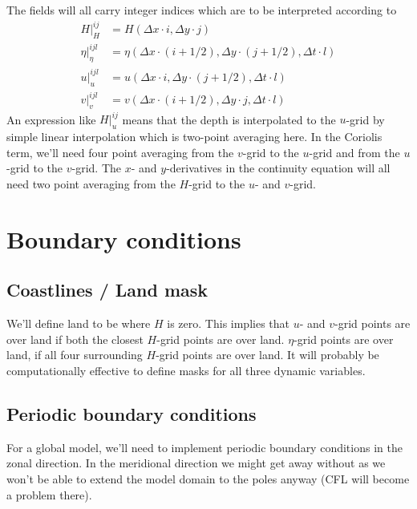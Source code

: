 \documentclass[a4paper]{article}
\begin{document}
The fields will all carry integer indices which are to be interpreted according to
\begin{align}
  H|_H^{ij} & = H(\Delta x \cdot i, \Delta y \cdot j) \\
  \eta|_\eta^{ijl} & = \eta(\Delta x \cdot (i+1/2), \Delta y \cdot (j+1/2), \Delta t \cdot l) \\
  u|_u^{ijl} & = u(\Delta x \cdot i, \Delta y \cdot (j+1/2), \Delta t \cdot l) \\
  v|_v^{ijl} & = v(\Delta x \cdot (i+1/2), \Delta y \cdot j, \Delta t \cdot l)
\end{align}
An expression like $H|_u^{ij}$ means that the depth is interpolated to the $u$-grid
by simple linear interpolation which is two-point averaging here. In the Coriolis term, 
we'll need four point averaging from the $v$-grid to the $u$-grid and from the $u$-grid
to the $v$-grid. The $x$- and $y$-derivatives in the continuity equation will all need 
two point averaging from the $H$-grid to the $u$- and $v$-grid.


\section{Boundary conditions}


\subsection{Coastlines / Land mask}

We'll define land to be where $H$ is zero. This implies that $u$- and $v$-grid
points are over land if both the closest $H$-grid points are over land.
$\eta$-grid points are over land, if all four surrounding $H$-grid points are over land.
It will probably be computationally effective to define masks for all three dynamic variables.


\subsection{Periodic boundary conditions}

For a global model, we'll need to implement periodic boundary conditions in the zonal
direction.  In the meridional direction we might get away without as we won't be able 
to extend the model domain to the poles anyway (CFL will become a problem there).
\end{document}
